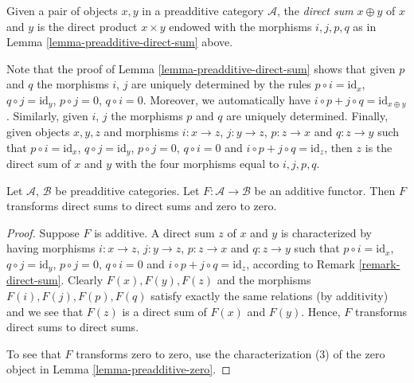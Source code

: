 \begin{definition}
\label{definition-direct-sum}
Given a pair of objects $x, y$ in a
preadditive category $\mathcal{A}$,
the {\it direct sum} $x \oplus y$ of $x$ and
$y$ is the direct
product $x \times y$ endowed with the
morphisms
$i, j, p, q$ as in Lemma
\ref{lemma-preadditive-direct-sum} above.
\end{definition}

\begin{remark}
\label{remark-direct-sum}
Note that the proof of Lemma
\ref{lemma-preadditive-direct-sum}
shows that given $p$ and $q$ the morphisms
$i$, $j$ are uniquely
determined by the rules $p \circ i =
\text{id}_x$,
$q \circ j = \text{id}_y$, $p \circ j = 0$,
$q \circ i = 0$.
Moreover, we automatically have
$i \circ p + j \circ q = \text{id}_{x \oplus
y}$.
Similarly, given $i$, $j$ the morphisms $p$
and $q$ are uniquely determined.
Finally, given objects $x, y, z$ and
morphisms
$i : x \to z$, $j : y \to z$, $p : z \to x$
and
$q : z \to y$ such that $p \circ i =
\text{id}_x$,
$q \circ j = \text{id}_y$, $p \circ j = 0$,
$q \circ i = 0$
and $i \circ p + j \circ q = \text{id}_z$,
then $z$
is the direct sum of $x$ and $y$ with the
four morphisms
equal to $i, j, p, q$.
\end{remark}

\begin{lemma}
\label{lemma-additive-additive}
Let $\mathcal{A}$, $\mathcal{B}$ be
preadditive categories.
Let $F : \mathcal{A} \to \mathcal{B}$ be an
additive functor.
Then $F$ transforms direct sums to direct
sums and zero to zero.
\end{lemma}

\begin{proof}
Suppose $F$ is additive. A direct sum $z$
of $x$ and $y$ is characterized by having
morphisms
$i : x \to z$, $j : y \to z$, $p : z \to x$
and
$q : z \to y$ such that $p \circ i =
\text{id}_x$,
$q \circ j = \text{id}_y$, $p \circ j = 0$,
$q \circ i = 0$
and $i \circ p + j \circ q = \text{id}_z$,
according
to Remark \ref{remark-direct-sum}. Clearly
$F(x), F(y), F(z)$
and the morphisms $F(i), F(j), F(p), F(q)$
satisfy exactly the
same relations (by additivity) and we see
that $F(z)$ is
a direct sum of $F(x)$ and $F(y)$.
Hence, $F$ transforms direct sums to direct
sums.

\medskip\noindent
To see that $F$ transforms zero to zero, use
the
characterization (3) of the zero object in
Lemma \ref{lemma-preadditive-zero}.
\end{proof}

